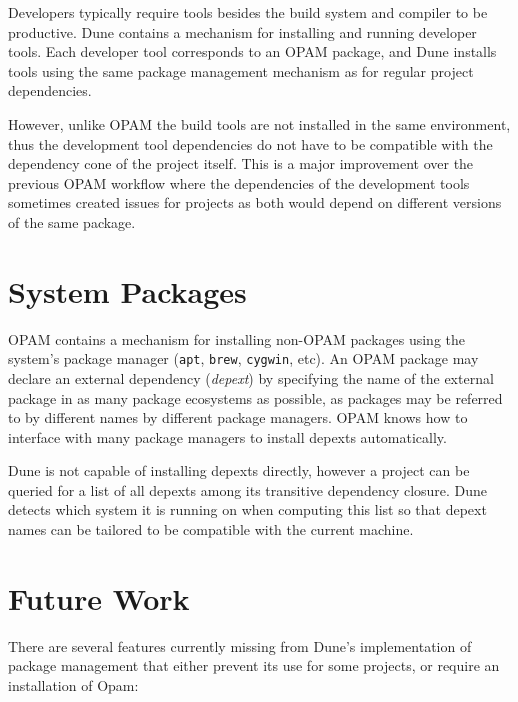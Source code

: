 \documentclass{article}
\begin{document}
\begin{multicols}{2}
        Developers typically require tools besides the build system and compiler
        to be productive. Dune contains a mechanism for installing and running
        developer tools. Each developer tool corresponds to an OPAM package, and
        Dune installs tools using the same package management mechanism as for
        regular project dependencies.

	However, unlike OPAM the build tools are not installed in the same
	environment, thus the development tool dependencies do not have to be
	compatible with the dependency cone of the project itself. This is a
	major improvement over the previous OPAM workflow where the
	dependencies of the development tools sometimes created issues for
	projects as both would depend on different versions of the same
	package.

        \section {System Packages}

        OPAM contains a mechanism for installing non-OPAM packages using the
        system's package manager (\texttt{apt}, \texttt{brew}, \texttt{cygwin},
        etc). An OPAM package may declare an external dependency
        (\textit{depext}) by specifying the name of the external package in as
        many package ecosystems as possible, as packages may be referred to by
        different names by different package managers. OPAM knows how to
        interface with many package managers to install depexts automatically.

        Dune is not capable of installing depexts directly, however a project
        can be queried for a list of all depexts among its transitive dependency
        closure. Dune detects which system it is running on when computing
        this list so that depext names can be tailored to be compatible with
        the current machine.

        \section {Future Work}

        There are several features currently missing from Dune's implementation
        of package management that either prevent its use for some projects, or
        require an installation of Opam:


\end{multicols}
\end{document}
